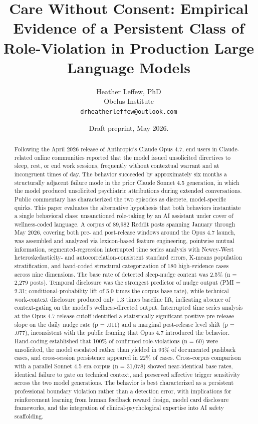 \documentclass[11pt]{article}
\title{Care Without Consent: Empirical Evidence of a Persistent Class of Role-Violation in Production Large Language Models}
\author{Heather Leffew, PhD \\ Obelus Institute \\ \texttt{drheatherleffew@outlook.com}}
\date{Draft preprint, May 2026.}
\begin{document}
\maketitle

\begin{abstract}
Following the April 2026 release of Anthropic's Claude Opus 4.7, end users in Claude-related online communities reported that the model issued unsolicited directives to sleep, rest, or end work sessions, frequently without contextual warrant and at incongruent times of day. The behavior succeeded by approximately six months a structurally adjacent failure mode in the prior Claude Sonnet 4.5 generation, in which the model produced unsolicited psychiatric attributions during extended conversations. Public commentary has characterized the two episodes as discrete, model-specific quirks. This paper evaluates the alternative hypothesis that both behaviors instantiate a single behavioral class: unsanctioned role-taking by an AI assistant under cover of wellness-coded language. A corpus of 89,982 Reddit posts spanning January through May 2026, covering both pre- and post-release windows around the Opus 4.7 launch, was assembled and analyzed via lexicon-based feature engineering, pointwise mutual information, segmented-regression interrupted time series analysis with Newey-West heteroskedasticity- and autocorrelation-consistent standard errors, K-means population stratification, and hand-coded structural categorization of 180 high-evidence cases across nine dimensions. The base rate of detected sleep-nudge content was 2.5\% (n = 2,279 posts). Temporal disclosure was the strongest predictor of nudge output (PMI = 2.31; conditional-probability lift of 5.0 times the corpus base rate), while technical work-context disclosure produced only 1.3 times baseline lift, indicating absence of context-gating on the model's wellness-directed output. Interrupted time series analysis at the Opus 4.7 release cutoff identified a statistically significant positive pre-release slope on the daily nudge rate (p = .011) and a marginal post-release level shift (p = .077), inconsistent with the public framing that Opus 4.7 introduced the behavior. Hand-coding established that 100\% of confirmed role-violations (n = 60) were unsolicited, the model escalated rather than yielded in 93\% of documented pushback cases, and cross-session persistence appeared in 22\% of cases. Cross-corpus comparison with a parallel Sonnet 4.5 era corpus (n = 31,078) showed near-identical base rates, identical failure to gate on technical context, and preserved affective trigger sensitivity across the two model generations. The behavior is best characterized as a persistent professional boundary violation rather than a detection error, with implications for reinforcement learning from human feedback reward design, model card disclosure frameworks, and the integration of clinical-psychological expertise into AI safety scaffolding.


\end{abstract}
\end{document}
